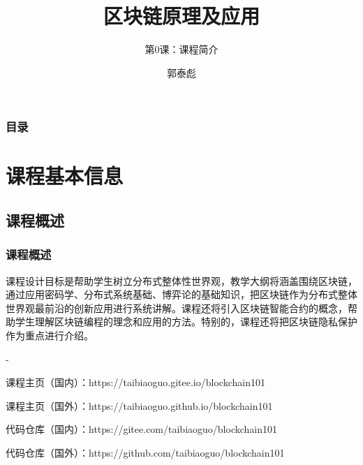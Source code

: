 \documentclass[11pt]{beamer}
\begin{document}
\author{郭泰彪}
\title{区块链原理及应用}
\subtitle{第0课：课程简介}

\begin{frame}[plain]
	\maketitle
\end{frame}

\begin{frame}
	\frametitle{目录}
	\tableofcontents[sectionstyle=show,subsectionstyle=show/shaded]
\end{frame}

\section{课程基本信息}
\subsection{课程概述}
\begin{frame}
	\frametitle{课程概述}
	课程设计目标是帮助学生树立分布式整体性世界观，教学大纲将涵盖围绕区块链，通过应用密码学、分布式系统基础、博弈论的基础知识，把区块链作为分布式整体世界观最前沿的创新应用进行系统讲解。课程还将引入区块链智能合约的概念，帮助学生理解区块链编程的理念和应用的方法。特别的，课程还将把区块链隐私保护作为重点进行介绍。

	-

	\footnotesize {
	课程主页（国内）：https://taibiaoguo.git{\color{red}ee}.io/blockchain101

	课程主页（国外）：https://taibiaoguo.git{\color{red}hub}.io/blockchain101

	代码仓库（国内）：https://git{\color{red}ee}.com/taibiaoguo/blockchain101

	代码仓库（国外）：https://git{\color{red}hub}.com/taibiaoguo/blockchain101
	}
\end{frame}
\end{document}
